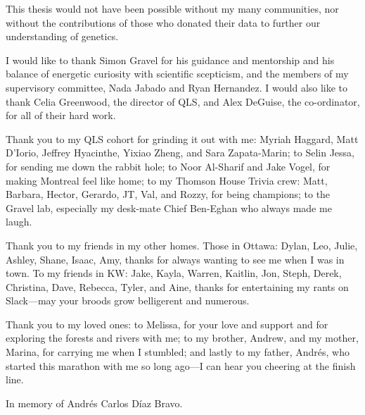 This thesis would not have been possible without my many communities, nor without the contributions of those who donated their data to further our understanding of genetics.

I would like to thank Simon Gravel for his guidance and mentorship and his balance of energetic curiosity with scientific scepticism, and the members of my supervisory committee, Nada Jabado and Ryan Hernandez. I would also like to thank Celia Greenwood, the director of QLS, and Alex DeGuise, the co-ordinator, for all of their hard work.

Thank you to my QLS cohort for grinding it out with me: Myriah Haggard, Matt D'Iorio, Jeffrey Hyacinthe, Yixiao Zheng, and Sara Zapata-Marin; to Selin Jessa, for sending me down the rabbit hole; to Noor Al-Sharif and Jake Vogel, for making Montreal feel like home; to my Thomson House Trivia crew: Matt, Barbara, Hector, Gerardo, JT, Val, and Rozzy, for being champions; to the Gravel lab, especially my desk-mate Chief Ben-Eghan who always made me laugh.

Thank you to my friends in my other homes. Those in Ottawa: Dylan, Leo, Julie, Ashley, Shane, Isaac, Amy, thanks for always wanting to see me when I was in town. To my friends in KW: Jake, Kayla, Warren, Kaitlin, Jon, Steph, Derek, Christina, Dave, Rebecca, Tyler, and Aine, thanks for entertaining my rants on Slack---may your broods grow belligerent and numerous.

Thank you to my loved ones: to Melissa, for your love and support and for exploring the forests and rivers with me; to my brother, Andrew, and my mother, Marina, for carrying me when I stumbled; and lastly to my father, Andr\'{e}s, who started this marathon with me so long ago---I can hear you cheering at the finish line.

\pagebreak
\hspace{0pt}
\vfill

\begin{center}
In memory of Andr\'{e}s Carlos D\'{i}az Bravo.
\end{center}

\vfill
\hspace{0pt}
\pagebreak
